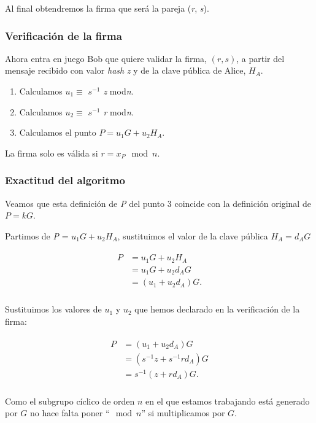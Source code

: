 \documentclass[11pt]{article}
\begin{document}
Al final obtendremos la firma que será la pareja (\textit{r}, \textit{s}).


\subsubsection*{Verificación de la firma}
Ahora entra en juego Bob que quiere validar la firma, $(r,s)$, a partir del mensaje recibido con valor \textit{hash} \textit{z} y de la clave pública de Alice, $H_A$.

\begin{enumerate}
	\item Calculamos $u_1 \equiv$ \textit{$s^{-1}$ z} mod\textit{n}.
	\item Calculamos $u_2 \equiv$ \textit{$s^{-1}$ r} mod\textit{n}.
	\item Calculamos el punto $P = u_1G + u_2 H_A$.	
\end{enumerate}

La firma solo es válida si $r = x_P \mod n$.
\subsubsection*{Exactitud del algoritmo}
Veamos que esta definición de \textit{P} del punto 3 coincide con la definición original de $P = kG $.

Partimos de \textit{P} = $u_1 G + u_2 H_A$, sustituimos el valor de la clave pública $H_A = d_A G$


\begin{align}
\begin{split}
\textit{P} &= u_1 G + u_2 H_A\\ &= u_1 G + u_2 d_A G\\
&=  (u_1 + u_2 d_A) G.\\
\end{split}
\end{align}

Sustituimos los valores de $u_1$ y $u_2$ que hemos declarado en la verificación de la firma:

\begin{align}
\begin{split}
P &= (u_1 + u_2 d_A) G\\
&= (s^{-1}z + s^{-1} r d_A) G  \\
&= s^{-1}(z + r d_A) G.\\
\end{split}
\end{align}

Como el subgrupo cíclico de orden $n$ en el que estamos trabajando está generado por $G$ no hace falta poner ``$\mod n$'' si multiplicamos por $G$.
\end{document}

